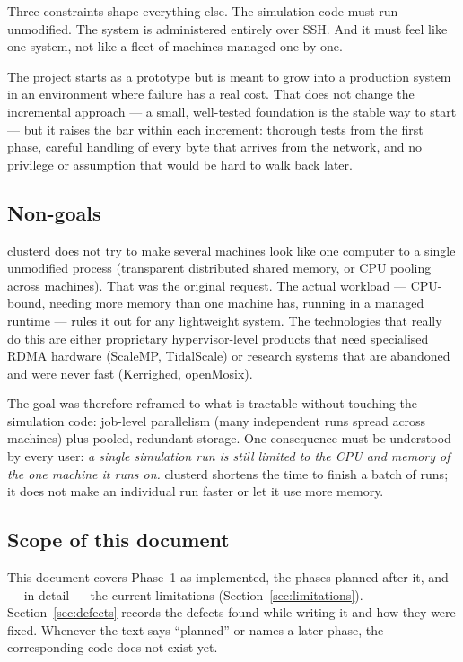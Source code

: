 \documentclass{article}
\begin{document}
Three constraints shape everything else. The simulation code must run
unmodified. The system is administered entirely over SSH. And it must
feel like one system, not like a fleet of machines managed one by one.

The project starts as a prototype but is meant to grow into a production
system in an environment where failure has a real cost. That does not
change the incremental approach --- a small, well-tested foundation is the
stable way to start --- but it raises the bar within each increment:
thorough tests from the first phase, careful handling of every byte that
arrives from the network, and no privilege or assumption that would be
hard to walk back later.

\subsection{Non-goals}

clusterd does not try to make several machines look like one computer to
a single unmodified process (transparent distributed shared memory, or
CPU pooling across machines). That was the original request. The actual
workload --- CPU-bound, needing more memory than one machine has, running
in a managed runtime --- rules it out for any lightweight system. The
technologies that really do this are either proprietary hypervisor-level
products that need specialised RDMA hardware (ScaleMP, TidalScale) or
research systems that are abandoned and were never fast (Kerrighed,
openMosix).

The goal was therefore reframed to what is tractable without touching the
simulation code: job-level parallelism (many independent runs spread
across machines) plus pooled, redundant storage. One consequence must be
understood by every user: \emph{a single simulation run is still limited
to the CPU and memory of the one machine it runs on.} clusterd shortens
the time to finish a batch of runs; it does not make an individual run
faster or let it use more memory.

\subsection{Scope of this document}

This document covers Phase~1 as implemented, the phases planned after it,
and --- in detail --- the current limitations
(Section~\ref{sec:limitations}). Section~\ref{sec:defects} records the
defects found while writing it and how they were fixed. Whenever the
text says ``planned'' or names
a later phase, the corresponding code does not exist yet.
\end{document}
